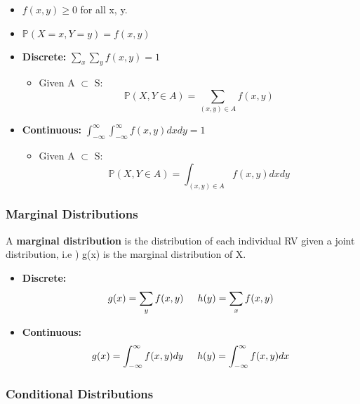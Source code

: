 \documentclass[10pt, letterpaper, twoside]{article}
\begin{document}
\begin{multicols}{2}
\begin{itemize}
    \item $f(x,y) \geq 0$ for all x, y.
    \item $\mathbb{P}(X = x, Y = y) = f(x,y)$
    \item \textbf{Discrete:} $\sum_x\sum_yf(x,y) = 1$
    \begin{itemize}
        \item Given A $\subset$ S:
        \begin{equation*}
            \mathbb{P}(X,Y \in A) = \sum_{(x,y)\in A}f(x,y)
        \end{equation*}
    \end{itemize}
    \item \textbf{Continuous:} $\int_{-\infty}^{\infty}\int_{-\infty}^{\infty}f(x,y)dxdy = 1$
    \begin{itemize}
        \item Given A $\subset$ S:
        \begin{equation*}
            \mathbb{P}(X,Y \in A) = \int_{(x,y)\in A}f(x,y)dxdy
        \end{equation*}
    \end{itemize}
\end{itemize}

\subsubsection{Marginal Distributions}

A \textbf{marginal distribution} is the distribution of each individual RV given a joint distribution, i.e ) g(x) is the marginal distribution of X.

\begin{itemize}
    \item \textbf{Discrete:}
    \begin{equation*}
        g(x) = \sum_y f(x,y) \hspace{0.5 cm} h(y) = \sum_x f(x,y)
    \end{equation*}
    \item \textbf{Continuous:}
    \begin{equation*}
        g(x) = \int_{-\infty}^{\infty}f(x,y)dy \hspace{0.5cm} h(y) = \int_{-\infty}^{\infty}f(x,y)dx
    \end{equation*}
\end{itemize}

\subsubsection{Conditional Distributions}


\end{multicols}
\end{document}
